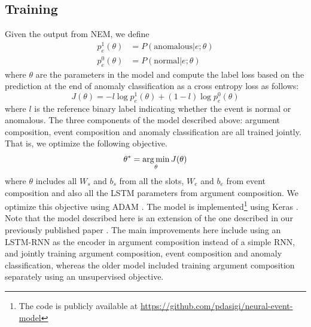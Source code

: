 \subsection{Training}
Given the output from NEM, we define
\begin{align}
 p^1_e(\theta) &= P(\text{anomalous} | e; \theta) \\
 p^0_e(\theta) &= P(\text{normal} | e; \theta)
\end{align}
where $\theta$ are the parameters in the model and compute the label loss based on the prediction at the end of anomaly classification as a cross entropy loss as follows:
\begin{equation}
J(\theta) = - l \log p^1_e(\theta) + (1-l) \log p^0_e(\theta)
\end{equation}
where $l$ is the reference binary label indicating whether the event is normal or
anomalous. The three components of the model described above: argument composition, event composition and anomaly classification are all trained jointly.
That is, we optimize the following objective.
\begin{equation}
 \theta^* = \operatorname*{arg\,min}_{\theta} J(\theta)
\end{equation}
where $\theta$ includes all $W_s$ and $b_s$ from all the slots, $W_e$ and $b_e$ from event composition and also all the LSTM parameters from argument composition.
We optimize this objective using ADAM \citep{kingma2014adam}. The model is implemented\footnote{The code is publicly available at \url{https://github.com/pdasigi/neural-event-model}}
using Keras \citep{chollet2015keras}. Note that the model described here is an extension of the one described in our previously published paper \citep{dasigi2014modeling}.
The main improvements here include using an LSTM-RNN as the encoder in argument composition instead of a simple RNN, and jointly training argument composition, event composition and anomaly classification,
whereas the older model included training argument composition separately using an unsupervised objective.


